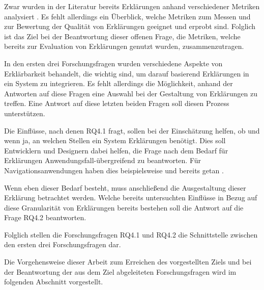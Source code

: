 Zwar wurden in der Literatur bereits Erklärungen anhand verschiedener Metriken analysiert \cite{wiegand2019drive,briand1995goal}. Es fehlt allerdings ein Überblick, welche Metriken zum Messen und zur Bewertung der Qualität von Erklärungen geeignet und erprobt sind. Folglich ist das Ziel bei der Beantwortung dieser offenen Frage, die Metriken, welche bereits zur Evaluation von Erklärungen genutzt wurden, zusammenzutragen.

\smallskip

\noindent{}

\smallskip

In den ersten drei Forschungsfragen wurden verschiedene Aspekte von Erklärbarkeit behandelt, die wichtig sind, um darauf basierend Erklärungen in ein System zu integrieren. Es fehlt allerdings die Möglichkeit, anhand der Antworten auf diese Fragen eine Auswahl bei der Gestaltung von Erklärungen zu treffen. Eine Antwort auf diese letzten beiden Fragen soll diesen Prozess unterstützen.

Die Einflüsse, nach denen RQ4.1 fragt, sollen bei der Einschätzung helfen, ob und wenn ja, an welchen Stellen ein System Erklärungen benötigt. Dies soll Entwicklern und Designern dabei helfen, die Frage nach dem Bedarf für Erklärungen Anwendungsfall-übergreifend zu beantworten. Für Navigationsanwendungen haben dies beispielsweise \citeauthor{chazette_end-users_nodate} und \citeauthor{wang_integration_2020} bereits getan \cite{chazette_end-users_nodate,wang_integration_2020}.

Wenn eben dieser Bedarf besteht, muss anschließend die Ausgestaltung dieser Erklärung betrachtet werden. Welche bereits untersuchten Einflüsse in Bezug auf diese Granularität von Erklärungen bereits bestehen soll die Antwort auf die Frage RQ4.2 beantworten.

Folglich stellen die Forschungsfragen RQ4.1 und RQ4.2 die Schnittstelle zwischen den ersten drei Forschungsfragen dar.

\bigskip

Die Vorgehensweise dieser Arbeit zum Erreichen des vorgestellten Ziels und bei der Beantwortung der aus dem Ziel abgeleiteten Forschungsfragen wird im folgenden Abschnitt vorgestellt.
